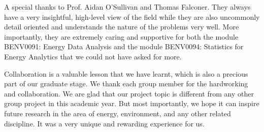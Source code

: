 
A special thanks to Prof. Aidan O'Sullivan and Thomas Falconer. They always have a very insightful, high-level view of the field while they are also uncommonly detail oriented and understands the nature of the problems very well. More importantly, they are extremely caring and supportive for both the module BENV0091: Energy Data Analysis and the module BENV0094: Statistics for Energy Analytics that we could not have asked for more.

Collaboration is a valuable lesson that we have learnt, which is also a precious part of our graduate stage. We thank each group member for the hardworking and collaboration. We are glad that our project topic is different from any other group project in this academic year. But most importantly, we hope it can inspire future research in the area of energy, environment, and any other related discipline. It was a very unique and rewarding experience for us.